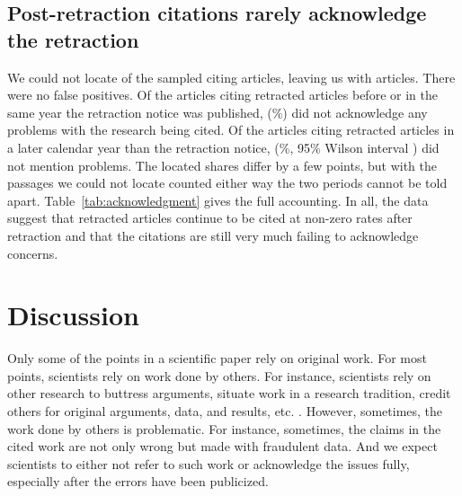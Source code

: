 \documentclass[11pt,letterpaper]{article}
\begin{document}
\begin{table}[tb]
\centering
\caption{Main contrast under leave-one-out and alternative clustering. Each row refits the main model on the stated subsample. Intervals are 95\%.}
\label{tab:robustness}
\end{table}

\subsection{Post-retraction citations rarely acknowledge the retraction}
\label{sec:ack}
We could not locate \AckNotLocated{} of the sampled citing articles, leaving us with \AckCoded{} articles. There were no false positives. Of the \AckThroughNoticeCoded{} articles citing retracted articles before or in the same year the retraction notice was published, \AckThroughNoticeUnack{} (\AckThroughNoticePercent\%) did not acknowledge any problems with the research being cited. Of the \AckAfterCoded{} articles citing retracted articles in a later calendar year than the retraction notice, \AckAfterUnack{} (\AckAfterPercent\%, 95\% Wilson interval \AckAfterInterval) did not mention problems. The located shares differ by a few points, but with the passages we could not locate counted either way the two periods cannot be told apart. Table~\ref{tab:acknowledgment} gives the full accounting. In all, the data suggest that retracted articles continue to be cited at non-zero rates after retraction and that the citations are still very much failing to acknowledge concerns.

\begin{table}[tb]
\centering
\caption{Hand coding of whether a citing passage acknowledged a problem with the cited retracted article, by whether the citing article appeared before, in, or after the year of the retraction notice. Intervals are 95\% Wilson intervals for the share with no problem acknowledged.}
\label{tab:acknowledgment}
\end{table}

\section{Discussion}
Only some of the points in a scientific paper rely on original work. For most points, scientists rely on work done by others. For instance, scientists rely on other research to buttress arguments, situate work in a research tradition, credit others for original arguments, data, and results, etc. \citep{erikson2014taxonomy}. However, sometimes, the work done by others is problematic. For instance, sometimes, the claims in the cited work are not only wrong but made with fraudulent data. And we expect scientists to either not refer to such work or acknowledge the issues fully, especially after the errors have been publicized.
\end{document}
